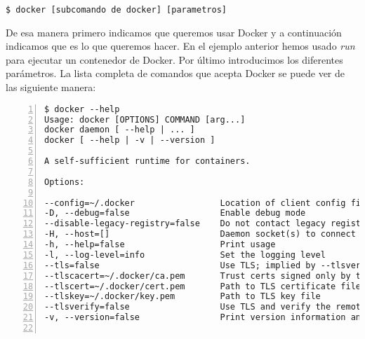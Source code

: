 	\begin{lstlisting}[style=consola]
$ docker [subcomando de docker] [parametros]
	\end{lstlisting}

	De esa manera primero indicamos que queremos usar Docker y a continuación indicamos que es lo que queremos hacer. En el ejemplo anterior hemos usado \textit{run} para ejecutar un contenedor de Docker. Por último introducimos los diferentes parámetros. La lista completa de comandos que acepta Docker se puede ver de las siguiente manera:
	\begin{lstlisting}[style=consola,numbers=left]
$ docker --help
Usage: docker [OPTIONS] COMMAND [arg...]
docker daemon [ --help | ... ]
docker [ --help | -v | --version ]

A self-sufficient runtime for containers.

Options:

--config=~/.docker                 Location of client config files
-D, --debug=false                  Enable debug mode
--disable-legacy-registry=false    Do not contact legacy registries
-H, --host=[]                      Daemon socket(s) to connect to
-h, --help=false                   Print usage
-l, --log-level=info               Set the logging level
--tls=false                        Use TLS; implied by --tlsverify
--tlscacert=~/.docker/ca.pem       Trust certs signed only by this CA
--tlscert=~/.docker/cert.pem       Path to TLS certificate file
--tlskey=~/.docker/key.pem         Path to TLS key file
--tlsverify=false                  Use TLS and verify the remote
-v, --version=false                Print version information and quit


\end{lstlisting}
